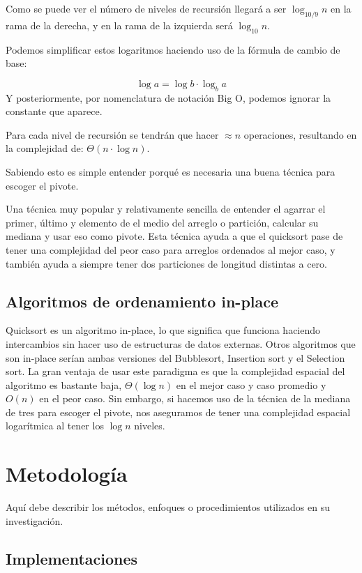 \documentclass[conference]{IEEEtran}
\begin{document}
Como se puede ver el número de niveles de recursión llegará a ser $\log_{10/9}{n}$ en la rama de la derecha, y en la rama de la izquierda será $\log_{10}{n}$.\par
Podemos simplificar estos logaritmos haciendo uso de la fórmula de cambio de base:

\begin{equation}
    \log{a} = \log{b}\cdot \log_b{a}
\end{equation}
Y posteriormente, por nomenclatura de notación Big O, podemos ignorar la constante que aparece.\par

Para cada nivel de recursión se tendrán que hacer $\approx n$ operaciones, resultando en la complejidad de: $\Theta(n\cdot \log{n})$.

Sabiendo esto es simple entender porqué es necesaria una buena técnica para escoger el pivote.
\par Una técnica muy popular y relativamente sencilla de entender el agarrar el primer, último y elemento de el medio del arreglo o partición, 
calcular su mediana y usar eso como pivote.
Esta técnica ayuda a que el quicksort pase de tener una complejidad del peor caso para arreglos ordenados al mejor caso, y también ayuda a siempre tener dos particiones de longitud distintas a cero.

\subsection{Algoritmos de ordenamiento in-place}
Quicksort es un algoritmo in-place, lo que significa que funciona haciendo intercambios sin hacer uso de estructuras de datos externas. Otros algoritmos que son in-place serían ambas versiones del Bubblesort, Insertion sort y el Selection sort.
La gran ventaja de usar este paradigma es que la complejidad espacial del algoritmo es bastante baja, $\Theta(\log{n})$ en el mejor caso y caso promedio y $O(n)$ en el peor caso.
Sin embargo, si hacemos uso de la técnica de la mediana de tres para escoger el pivote, nos aseguramos de tener una complejidad espacial logarítmica al tener los $\log{n}$ niveles.\cite{space_complexity}

\section{Metodología}
Aquí debe describir los métodos, enfoques o procedimientos utilizados en su investigación.
\subsection{Implementaciones}
\end{document}
